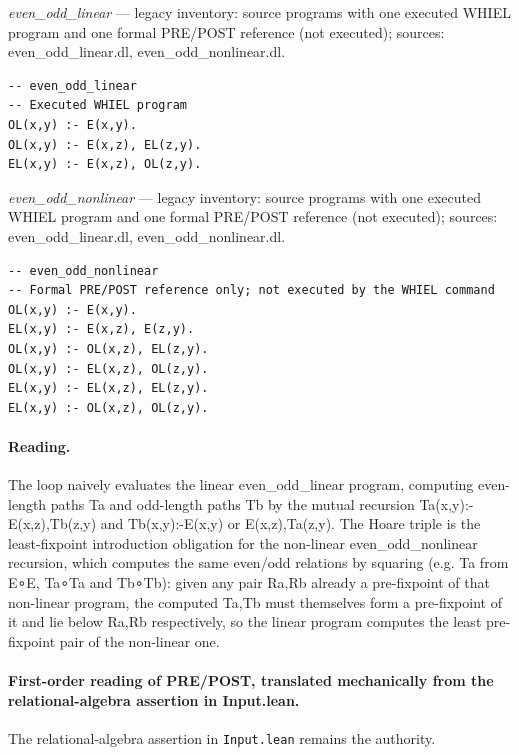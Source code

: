 \documentclass[10pt]{article}
\begin{document}
{\raggedright\textit{even\_odd\_linear} --- legacy inventory: source programs with one executed WHIEL program and one formal PRE/POST reference (not executed); sources: even\_odd\_linear.dl, even\_odd\_nonlinear.dl.\par}

\begin{Verbatim}[fontsize=\scriptsize,breaklines=true,breakanywhere=true,frame=single,framesep=1.5mm]
-- even_odd_linear
-- Executed WHIEL program
OL(x,y) :- E(x,y).
OL(x,y) :- E(x,z), EL(z,y).
EL(x,y) :- E(x,z), OL(z,y).
\end{Verbatim}

{\raggedright\textit{even\_odd\_nonlinear} --- legacy inventory: source programs with one executed WHIEL program and one formal PRE/POST reference (not executed); sources: even\_odd\_linear.dl, even\_odd\_nonlinear.dl.\par}

\begin{Verbatim}[fontsize=\scriptsize,breaklines=true,breakanywhere=true,frame=single,framesep=1.5mm]
-- even_odd_nonlinear
-- Formal PRE/POST reference only; not executed by the WHIEL command
OL(x,y) :- E(x,y).
EL(x,y) :- E(x,z), E(z,y).
OL(x,y) :- OL(x,z), EL(z,y).
OL(x,y) :- EL(x,z), OL(z,y).
EL(x,y) :- EL(x,z), EL(z,y).
EL(x,y) :- OL(x,z), OL(z,y).
\end{Verbatim}

\paragraph{Reading.} The loop naively evaluates the linear even\_odd\_linear program, computing even-length paths Ta and odd-length paths Tb by the mutual recursion Ta(x,y):-E(x,z),Tb(z,y) and Tb(x,y):-E(x,y) or E(x,z),Ta(z,y). The Hoare triple is the least-fixpoint introduction obligation for the non-linear even\_odd\_nonlinear recursion, which computes the same even/odd relations by squaring (e.g. Ta from E∘E, Ta∘Ta and Tb∘Tb): given any pair Ra,Rb already a pre-fixpoint of that non-linear program, the computed Ta,Tb must themselves form a pre-fixpoint of it and lie below Ra,Rb respectively, so the linear program computes the least pre-fixpoint pair of the non-linear one.

\paragraph{First-order reading of PRE/POST, translated mechanically from the relational-algebra assertion in Input.lean.} The relational-algebra assertion in \texttt{Input.lean} remains the authority.
\end{document}

